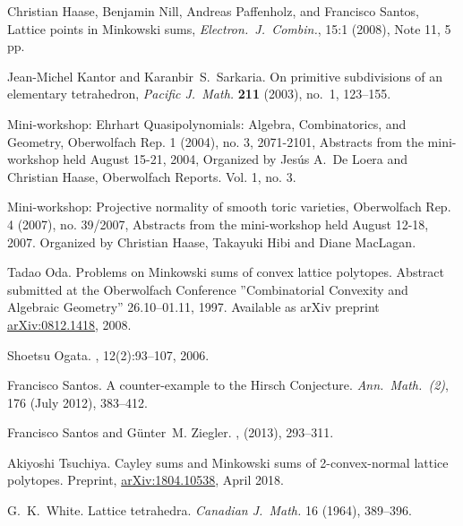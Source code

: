 \documentclass{amsart}
\theoremstyle{plain}
\theoremstyle{definition}
\begin{document}
\begin{thebibliography}{99}
Christian Haase, Benjamin Nill, Andreas Paffenholz, and Francisco Santos, Lattice points in Minkowski sums, 
\emph{Electron.~J.~Combin.}, 15:1 (2008), Note 11, 5 pp. 


Jean-Michel Kantor and Karanbir~S.\ Sarkaria.
On primitive subdivisions of an elementary tetrahedron, 
\emph{Pacific J.~Math.} \textbf{211} (2003), no.~1,  123--155. 

Mini-workshop: Ehrhart Quasipolynomials: Algebra, Combinatorics, and Geometry, Oberwolfach Rep. 1 (2004), no. 3, 2071-2101, Abstracts from the mini-workshop held August 15-21, 2004, Organized by Jes\'us A.~De Loera and Christian Haase, Oberwolfach Reports. Vol. 1, no. 3. 

Mini-workshop: Projective normality of smooth toric varieties, Oberwolfach Rep. 4 (2007), no. 39/2007, Abstracts from the mini-workshop held August 12-18, 2007. Organized by Christian Haase, Takayuki Hibi and Diane MacLagan. 

Tadao Oda. Problems on Minkowski sums of convex lattice polytopes. 
Abstract submitted at the Oberwolfach Conference ''Combinatorial Convexity and Algebraic Geometry'' 26.10--01.11, 1997.
Available as arXiv preprint \href{https://arxiv.org/abs/0812.1418}{arXiv:0812.1418}, 2008.

Shoetsu Ogata.
, 12(2):93--107, 2006. 

Francisco Santos.
A counter-example to the Hirsch Conjecture.
\emph{Ann.~Math.~(2)}, 176 (July 2012), 383--412. 

Francisco Santos and G{\"u}nter~M. Ziegler.
, 
 (2013), 293--311. 

Akiyoshi Tsuchiya.
Cayley sums and Minkowski sums of 2-convex-normal lattice polytopes.
Preprint,  \href{https://arxiv.org/abs/1804.10538}{arXiv:1804.10538}, April 2018.


G.~K.~White.
Lattice tetrahedra.
\emph{Canadian J.~Math.} 16 (1964), 389--396. 

\end{thebibliography}
\end{document}
